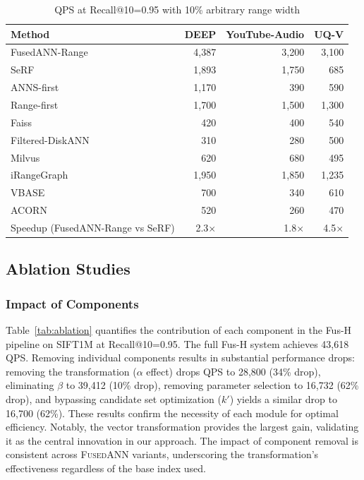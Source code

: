 \documentclass[numbers,sort]{article}
\begin{document}
\begin{table}[t]
\centering
\caption{QPS at Recall@10=0.95 with 10\% arbitrary range width}
\label{tab:arbitrary_range}
\begin{tabular}{lrrr}
\toprule
Method & DEEP & YouTube-Audio & UQ-V \\
\midrule
FusedANN-Range   & 4,387 & 3,200 & 3,100 \\
SeRF             & 1,893 & 1,750 & 685   \\
ANNS-first       & 1,170 & 390   & 590   \\
Range-first      & 1,700 & 1,500 & 1,300 \\
Faiss            & 420   & 400   & 540   \\
Filtered-DiskANN & 310   & 280   & 500   \\
Milvus           & 620   & 680   & 495   \\
iRangeGraph      & 1,950 & 1,850 & 1,235 \\
VBASE            & 700   & 340   & 610   \\
ACORN            & 520   & 260   & 470   \\
\midrule
Speedup (FusedANN-Range vs SeRF) & 2.3$\times$ & 1.8$\times$ & 4.5$\times$ \\
\bottomrule
\end{tabular}
\end{table}


\subsection{Ablation Studies}

\subsubsection{Impact of Components}

Table~\ref{tab:ablation} quantifies the contribution of each component in the Fus-H pipeline on SIFT1M at Recall@10=0.95. The full Fus-H system achieves 43,618 QPS. Removing individual components results in substantial performance drops: removing the transformation ($\alpha$ effect) drops QPS to 28,800 (34\% drop), eliminating $\beta$ to 39,412 (10\% drop), removing parameter selection to 16,732 (62\% drop), and bypassing candidate set optimization ($k'$) yields a similar drop to 16,700 (62\%). These results confirm the necessity of each module for optimal efficiency. Notably, the vector transformation provides the largest gain, validating it as the central innovation in our approach. The impact of component removal is consistent across \textsc{FusedANN} variants, underscoring the transformation’s effectiveness regardless of the base index used.
\end{document}
